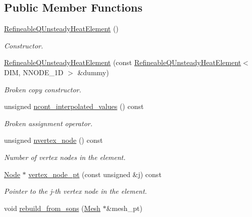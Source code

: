 \subsection*{Public Member Functions}
\begin{DoxyCompactItemize}
\item 
\hyperlink{classoomph_1_1RefineableQUnsteadyHeatElement_ae1769d1d3f4c15e57c3970b67930fe66}{Refineable\+Q\+Unsteady\+Heat\+Element} ()
\begin{DoxyCompactList}\small\item\em Constructor. \end{DoxyCompactList}\item 
\hyperlink{classoomph_1_1RefineableQUnsteadyHeatElement_a7a49d849293f74b46dc261c89c6234b4}{Refineable\+Q\+Unsteady\+Heat\+Element} (const \hyperlink{classoomph_1_1RefineableQUnsteadyHeatElement}{Refineable\+Q\+Unsteady\+Heat\+Element}$<$ D\+IM, N\+N\+O\+D\+E\+\_\+1D $>$ \&dummy)
\begin{DoxyCompactList}\small\item\em Broken copy constructor. \end{DoxyCompactList}\item 
unsigned \hyperlink{classoomph_1_1RefineableQUnsteadyHeatElement_a243ef941f45a040393b542992babdfcf}{ncont\+\_\+interpolated\+\_\+values} () const
\begin{DoxyCompactList}\small\item\em Broken assignment operator. \end{DoxyCompactList}\item 
unsigned \hyperlink{classoomph_1_1RefineableQUnsteadyHeatElement_a5492bc9cbf7a118fe4c707ba3c7e9685}{nvertex\+\_\+node} () const
\begin{DoxyCompactList}\small\item\em Number of vertex nodes in the element. \end{DoxyCompactList}\item 
\hyperlink{classoomph_1_1Node}{Node} $\ast$ \hyperlink{classoomph_1_1RefineableQUnsteadyHeatElement_a1d82313d60a69d06bf02e807e4718a7a}{vertex\+\_\+node\+\_\+pt} (const unsigned \&j) const
\begin{DoxyCompactList}\small\item\em Pointer to the j-\/th vertex node in the element. \end{DoxyCompactList}\item 
void \hyperlink{classoomph_1_1RefineableQUnsteadyHeatElement_add4a7e0089818e439e156d1ed7c9fd6f}{rebuild\+\_\+from\+\_\+sons} (\hyperlink{classoomph_1_1Mesh}{Mesh} $\ast$\&mesh\+\_\+pt)

\end{DoxyCompactItemize}
